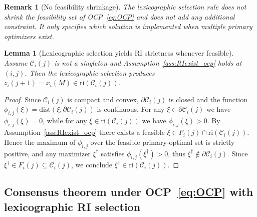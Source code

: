 \documentclass[12pt,draftcls,onecolumn]{IEEEtran}
\newtheorem{lemma}{Lemma}
\newtheorem{remark}{Remark}
\def\Cij{\mathcal{C}_i (j)}
\def\dist{\mathrm{dist}}
\def\ri{\mathrm{ri}}
\begin{document}
\begin{remark}[No feasibility shrinkage]\label{rem:no_feas_shrink_ocp}
The lexicographic selection rule does \emph{not} shrink the feasibility set of OCP~\eqref{eq:OCP} and does not
add any additional constraint. It only specifies which solution is implemented when multiple primary optimizers
exist.
\end{remark}

\begin{lemma}[Lexicographic selection yields RI strictness whenever feasible]\label{lem:lex_RI}
Assume $\Cij$ is not a singleton and Assumption~\ref{ass:RIexist_ocp} holds at $(i,j)$.
Then the lexicographic selection produces $z_i(j+1)=x_i(M)\in \ri(\Cij)$.
\end{lemma}

\begin{proof}
Since $\Cij$ is compact and convex, $\partial \Cij$ is closed and the function
$\phi_{i,j}(\xi)=\dist(\xi,\partial \Cij)$ is continuous.
For any $\xi\in \partial \Cij$ we have $\phi_{i,j}(\xi)=0$, while for any
$\xi\in\ri(\Cij)$ we have $\phi_{i,j}(\xi)>0$.
By Assumption~\ref{ass:RIexist_ocp} there exists a feasible $\tilde\xi\in F_i(j)\cap\ri(\Cij)$.
Hence the maximum of $\phi_{i,j}$ over the feasible primary-optimal set is strictly positive, and any maximizer
$\xi^\dagger$ satisfies $\phi_{i,j}(\xi^\dagger)>0$, thus $\xi^\dagger\notin\partial \Cij$.
Since $\xi^\dagger\in F_i(j)\subseteq \Cij$, we conclude $\xi^\dagger\in \ri(\Cij)$.
\end{proof}

\subsection{Consensus theorem under OCP~\eqref{eq:OCP} with lexicographic RI selection}
\end{document}
